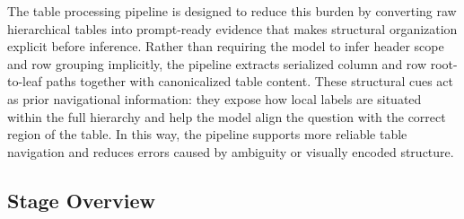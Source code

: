 ﻿\documentclass[a4paper]{article}
\begin{document}
The table processing pipeline is designed to reduce this burden by converting raw hierarchical tables into prompt-ready evidence that makes structural organization explicit before inference. Rather than requiring the model to infer header scope and row grouping implicitly, the pipeline extracts serialized column and row root-to-leaf paths together with canonicalized table content. These structural cues act as prior navigational information: they expose how local labels are situated within the full hierarchy and help the model align the question with the correct region of the table. In this way, the pipeline supports more reliable table navigation and reduces errors caused by ambiguity or visually encoded structure.

\subsection{Stage Overview}
\end{document}
